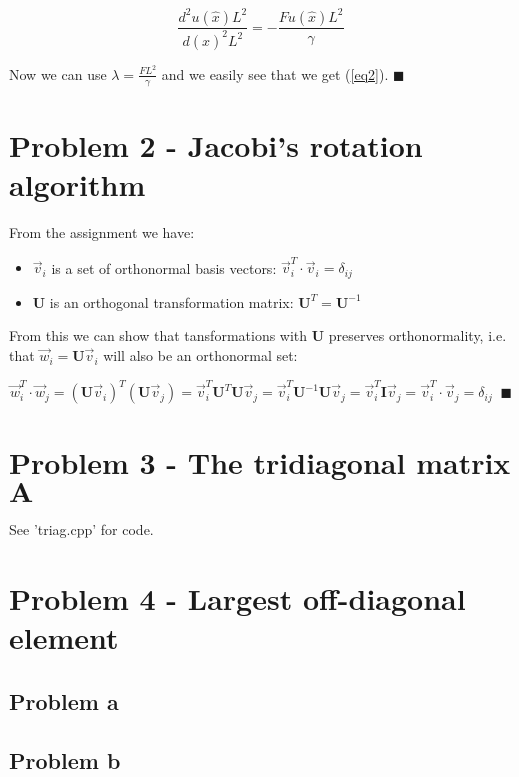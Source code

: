\documentclass[english,notitlepage]{revtex4-1}  %
\begin{document}
\begin{equation*}
    \frac{d^2u(\hat{x})L^2}{d(\hat{x})^2L^2} = - \frac{Fu(\hat{x})L^2}{\gamma}
\end{equation*}

Now we can use $\lambda = \frac{FL^2}{\gamma}$ and we easily see that we get (\ref{eq2}). $\blacksquare$


\section*{Problem 2 - Jacobi’s rotation algorithm}

From the assignment we have:

\begin{itemize}
    \item $\vec{v}_i$ is a set of orthonormal basis vectors: $\vec{v}_i^T \cdot \vec{v}_i = \delta_{ij}$
    \item $\mathbf{U}$ is an orthogonal transformation matrix: $\mathbf{U}^T = \mathbf{U}^{-1}$
\end{itemize}

From this we can show that tansformations with $\mathbf{U}$ preserves orthonormality, i.e. that $\vec{w}_i = \mathbf{U} \vec{v}_i$ will also be an orthonormal set:

\begin{equation*}
    \vec{w}_i^T \cdot \vec{w}_j = (\mathbf{U}\vec{v}_i)^T (\mathbf{U} \vec{v}_j) = \vec{v}_i^T \mathbf{U}^T \mathbf{U} \vec{v}_j = \vec{v}_i^T \mathbf{U}^{-1} \mathbf{U} \vec{v}_j 
    = \vec{v}_i^T  \mathbf{I} \vec{v}_j = \vec{v}_i^T  \cdot \vec{v}_j = \delta_{ij} \;\; \blacksquare
\end{equation*}


\section*{Problem 3 - The tridiagonal matrix $\mathbf{A}$}
See 'triag.cpp' for code. 

\section*{Problem 4 - Largest off-diagonal element}

\subsection*{Problem a}

\subsection*{Problem b}
\end{document}
